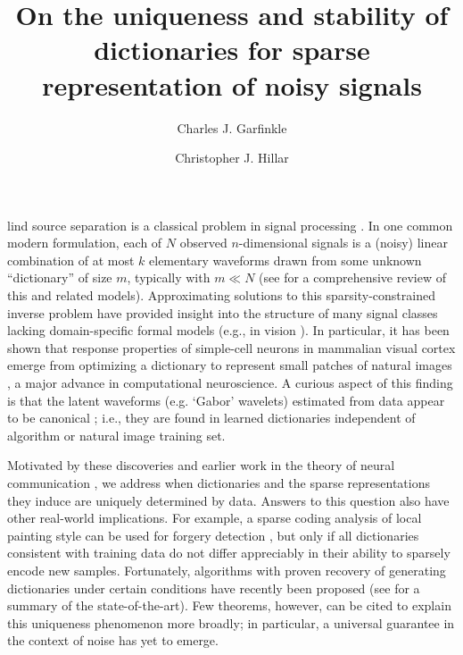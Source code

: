 \documentclass[9pt,twocolumn]{pnas-new}
\title{On the uniqueness and stability of dictionaries for sparse representation of noisy signals}
\author[a,b, 1]{Charles J. Garfinkle}
\author[a,1]{Christopher J. Hillar}
\affil[a]{Redwood Center for Theoretical Neuroscience, Berkeley, CA, USA}
\affil[b]{Helen Wills Neuroscience Institute, UC Berkeley}
\begin{document}
\verticaladjustment{-2pt}

\maketitle
\thispagestyle{firststyle}

lind source separation is a classical problem in signal processing \cite{sato1975method}.
In one common modern formulation, each of $N$ observed $n$-dimensional signals is a (noisy) linear combination of at most $k$ elementary waveforms drawn from some unknown ``dictionary'' of size $m$, typically with $m \ll N$ (see \cite{Zhang15} for a comprehensive review of this and related models).
Approximating solutions to this sparsity-constrained inverse problem have provided insight into the structure of many signal classes lacking domain-specific formal models (e.g., in vision \cite{wang2015sparse}).  In particular, it has been shown that response properties of simple-cell neurons in mammalian visual cortex emerge from optimizing a dictionary to represent small patches of natural images \cite{Olshausen96, hurri1996image, bell1997independent, van1998independent}, a major advance in computational neuroscience. A curious aspect of this finding is that the latent waveforms (e.g. `Gabor' wavelets) estimated from data appear to be canonical \cite{donoho2001can};
i.e., they are found in learned dictionaries independent of algorithm or natural image training set.

Motivated by these discoveries and earlier work in the theory of neural communication \cite{Isely10}, we address when dictionaries and the sparse representations they induce are uniquely determined by data.  Answers to this question also have other real-world implications.  For example, a sparse coding analysis of local painting style can be used for forgery detection \cite{hughes2010, Olshausen10}, but only if all dictionaries consistent with training data do not differ appreciably in their ability to sparsely encode new samples. 
Fortunately, algorithms with proven recovery of generating dictionaries under certain 
conditions have recently been proposed (see \cite[Sec.~I-E]{Sun16} for a summary of the state-of-the-art). Few theorems, however, can be cited to explain this uniqueness phenomenon more broadly; in particular, a universal guarantee in the context of noise has yet to emerge.
\end{document}
